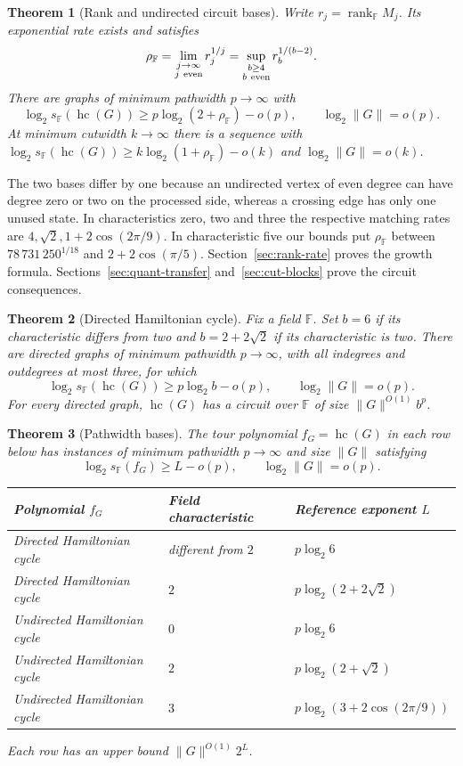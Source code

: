 \documentclass[11pt]{article}
\newtheorem{theorem}{Theorem}[section]
\theoremstyle{definition}
\newcommand{\F}{\mathbb F}
\newcommand{\hc}{\operatorname{hc}}
\newcommand{\rank}{\operatorname{rank}}
\begin{document}
\begin{theorem}[Rank and undirected circuit bases]\label{thm:rate-intro}
Write \(r_j=\rank_\F M_j\). Its exponential rate exists and satisfies
\[
 \rho_\F=\lim_{\substack{j\to\infty\\j\ {\rm even}}}r_j^{1/j}
        =\sup_{\substack{b\ge4\\b\ {\rm even}}}r_b^{1/(b-2)} .
\]
There are graphs of minimum pathwidth \(p\to\infty\) with
\[
 \log_2 s_\F(\hc(G))\ge p\log_2(2+\rho_\F)-o(p),\qquad \log_2 \|G\|=o(p).
\]
At minimum cutwidth \(k\to\infty\) there is a sequence with \(\log_2 s_\F(\hc(G))\ge k\log_2(1+\rho_\F)-o(k)\) and \(\log_2 \|G\|=o(k)\).
\end{theorem}
The two bases differ by one because an undirected vertex of even degree can have degree zero or two on the processed side, whereas a crossing edge has only one unused state. In characteristics zero, two and three the respective matching rates are \(4,\sqrt2,1+2\cos(2\pi/9)\). In characteristic five our bounds put \(\rho_\F\) between \(78\,731\,250^{1/18}\) and \(2+2\cos(\pi/5)\). Section~\ref{sec:rank-rate} proves the growth formula. Sections~\ref{sec:quant-transfer} and~\ref{sec:cut-blocks} prove the circuit consequences.

\begin{theorem}[Directed Hamiltonian cycle]\label{thm:tours}
Fix a field \(\F\). Set \(b=6\) if its characteristic differs from two and \(b=2+2\sqrt 2\) if its characteristic is two. There are directed graphs of minimum pathwidth \(p\to\infty\), with all indegrees and outdegrees at most three, for which
\[
             \log_2 s_{\F}(\hc(G))\ge p\log_2 b-o(p),\qquad \log_2 \|G\|=o(p).
\]
For every directed graph, \(\hc(G)\) has a circuit over \(\F\) of size \(\|G\|^{O(1)}b^p\).
\end{theorem}

\begin{theorem}[Pathwidth bases]\label{thm:path-bases}
The tour polynomial \(f_G=\hc(G)\) in each row below has instances of minimum pathwidth \(p\to\infty\) and size \(\|G\|\) satisfying
\[
                 \log_2 s_{\F}(f_G)\ge L-o(p),
                 \qquad \log_2 \|G\|=o(p).
\]
\begin{center}
\normalfont\begin{tabular}{@{}lll@{}}
\hline
Polynomial \(f_G\) & Field characteristic & Reference exponent \(L\)\\
\hline
Directed Hamiltonian cycle & different from \(2\) & \(p\log_2 6\)\\
Directed Hamiltonian cycle & \(2\) & \(p\log_2(2+2\sqrt2)\)\\
Undirected Hamiltonian cycle & \(0\) & \(p\log_2 6\)\\
Undirected Hamiltonian cycle & \(2\) & \(p\log_2(2+\sqrt2)\)\\
Undirected Hamiltonian cycle & \(3\) & \(p\log_2(3+2\cos(2\pi/9))\)\\
\hline
\end{tabular}
\end{center}
Each row has an upper bound \(\|G\|^{O(1)}2^L\).
\end{theorem}
\end{document}
